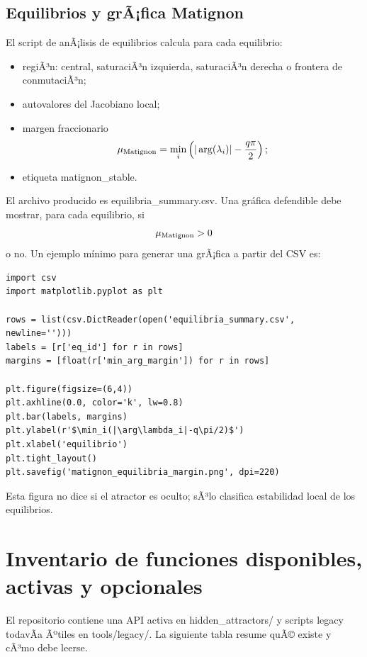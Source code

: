 \documentclass[11pt]{article}
\newcommand{\code}[1]{\path{#1}}
\DeclareRobustCommand{\codepath}[1]{\begingroup\Urlmuskip=0mu plus 2mu\path{#1}\endgroup}
\def\codepath#1{#1}%
\def\code#1{#1}%
\begin{document}
\subsection{Equilibrios y grÃ¡fica Matignon}

El script de anÃ¡lisis de equilibrios calcula para cada equilibrio:
\begin{itemize}
\item regiÃ³n: central, saturaciÃ³n izquierda, saturaciÃ³n derecha o frontera de conmutaciÃ³n;
\item autovalores del Jacobiano local;
\item margen fraccionario
\begin{equation}
\mu_{\rm Matignon}=\min_i\left(|\arg(\lambda_i)|-\frac{q\pi}{2}\right);
\end{equation}
\item etiqueta \codepath{matignon_stable}.
\end{itemize}
El archivo producido es \code{equilibria\_summary.csv}.
Una gráfica defendible debe mostrar, para cada equilibrio, si
\begin{equation}
\mu_{\rm Matignon}>0
\end{equation}
o no. Un ejemplo mínimo para generar una grÃ¡fica a partir del CSV es:
\begin{lstlisting}
import csv
import matplotlib.pyplot as plt

rows = list(csv.DictReader(open('equilibria_summary.csv', newline='')))
labels = [r['eq_id'] for r in rows]
margins = [float(r['min_arg_margin']) for r in rows]

plt.figure(figsize=(6,4))
plt.axhline(0.0, color='k', lw=0.8)
plt.bar(labels, margins)
plt.ylabel(r'$\min_i(|\arg\lambda_i|-q\pi/2)$')
plt.xlabel('equilibrio')
plt.tight_layout()
plt.savefig('matignon_equilibria_margin.png', dpi=220)
\end{lstlisting}
Esta figura no dice si el atractor es oculto; sÃ³lo clasifica estabilidad local de los equilibrios.

\section{Inventario de funciones disponibles, activas y opcionales}
\label{sec:inventario_funciones_disponibles}

El repositorio contiene una API activa en \codepath{hidden_attractors/} y scripts legacy todavÃ­a Ãºtiles en \codepath{tools/legacy/}. La siguiente tabla resume quÃ© existe y cÃ³mo debe leerse.
\end{document}
